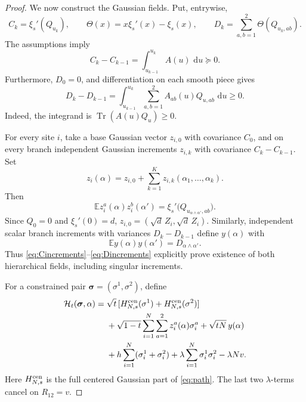 \documentclass[11pt]{article}
\numberwithin{equation}{section}
\theoremstyle{plain}
\theoremstyle{definition}
\newcommand{\E}{\mathbb E}
\newcommand{\1}{\mathbf 1}
\newcommand{\dd}{\,\mathrm d}
\newcommand{\Tr}{\operatorname{Tr}}
\begin{document}
\begin{proof}
We now construct the Gaussian fields.  Put, entrywise,
\begin{equation}
 C_k=\xi_s'(Q_{u_k}),\qquad
 \Theta(x)=x\xi_s'(x)-\xi_s(x),\qquad
 D_k=\sum_{a,b=1}^2\Theta(Q_{u_k,ab}).
 \label{eq:CDlevels}
\end{equation}
The assumptions imply
\begin{equation}
 C_k-C_{k-1}
 =\int_{u_{k-1}}^{u_k}A(u)\,\dd u\succeq0.
 \label{eq:Cincrements}
\end{equation}
Furthermore, $D_0=0$, and differentiation on each smooth piece gives
\begin{equation}
 D_k-D_{k-1}
 =\int_{u_{k-1}}^{u_k}
 \sum_{a,b=1}^2A_{ab}(u)Q_{u,ab}\,\dd u\ge0.
 \label{eq:Dincrements}
\end{equation}
Indeed, the integrand is $\Tr(A(u)Q_u)\ge0$.

For every site $i$, take a base Gaussian vector $z_{i,0}$ with
covariance $C_0$, and on every branch independent Gaussian increments
$z_{i,k}$ with covariance $C_k-C_{k-1}$.  Set
\[
 z_i(\alpha)=z_{i,0}+\sum_{k=1}^K
 z_{i,k}(\alpha_1,\ldots,\alpha_k).
\]
Then
\begin{equation}
 \E z_i^a(\alpha)z_i^b(\alpha')
 =\xi_s'\bigl(Q_{u_{\alpha\wedge\alpha'},ab}\bigr).
 \label{eq:zcovariance}
\end{equation}
Since $Q_0=0$ and $\xi_s'(0)=d$,
$z_{i,0}=(\sqrt d\,Z_i,\sqrt d\,Z_i)$.  Similarly, independent
scalar branch increments with variances $D_k-D_{k-1}$ define
$y(\alpha)$ with
\begin{equation}
 \E y(\alpha)y(\alpha')=D_{\alpha\wedge\alpha'}.
 \label{eq:ycovariance}
\end{equation}
Thus \eqref{eq:Cincrements}--\eqref{eq:Dincrements} explicitly prove
existence of both hierarchical fields, including singular increments.

For a constrained pair
$\boldsymbol\sigma=(\sigma^1,\sigma^2)$, define
\begin{align}
 \mathcal H_t(\boldsymbol\sigma,\alpha)
 ={}&\sqrt t\,[H_{N,s}^{\rm cen}(\sigma^1)
                     +H_{N,s}^{\rm cen}(\sigma^2)]\nonumber\\
 &+\sqrt{1-t}\sum_{i=1}^N\sum_{a=1}^2
 z_i^a(\alpha)\sigma_i^a+\sqrt{tN}\,y(\alpha)\nonumber\\
 &+h\sum_{i=1}^N(\sigma_i^1+\sigma_i^2)
 +\lambda\sum_{i=1}^N\sigma_i^1\sigma_i^2-\lambda Nv.
 \label{eq:GTinterpolatingHamiltonian}
\end{align}
Here $H_{N,s}^{\rm cen}$ is the full centered Gaussian part of
\eqref{eq:path}.  The last two $\lambda$-terms cancel on
$R_{12}=v$.


\end{proof}
\end{document}
